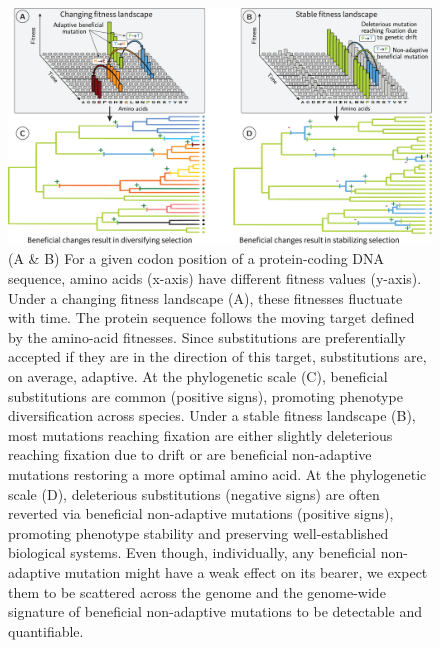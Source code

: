 \documentclass{article}
\begin{document}
    \newpage
    \begin{figure}[!htb]
        \centering
        \includegraphics[width=\textwidth, page=1] {figure1.eps}
        \caption{
            (A \& B) For a given codon position of a protein-coding DNA sequence, amino acids (x-axis) have different fitness values (y-axis).
            Under a changing fitness landscape (A), these fitnesses fluctuate with time.
            The protein sequence follows the moving target defined by the amino-acid fitnesses. Since substitutions are preferentially accepted if they are in the direction of this target, substitutions are, on average, adaptive.
            At the phylogenetic scale (C), beneficial substitutions are common (positive signs), promoting phenotype diversification across species.
            Under a stable fitness landscape (B), most mutations reaching fixation are either slightly deleterious reaching fixation due to drift or are beneficial non-adaptive mutations restoring a more optimal amino acid.
            At the phylogenetic scale (D), deleterious substitutions (negative signs) are often reverted via beneficial non-adaptive mutations (positive signs), promoting phenotype stability and preserving well-established biological systems.
            Even though, individually, any beneficial non-adaptive mutation might have a weak effect on its bearer, we expect them to be scattered across the genome and the genome-wide signature of beneficial non-adaptive mutations to be detectable and quantifiable.}
        \label{fig:fitness-landscape}
    \end{figure}
\end{document}
